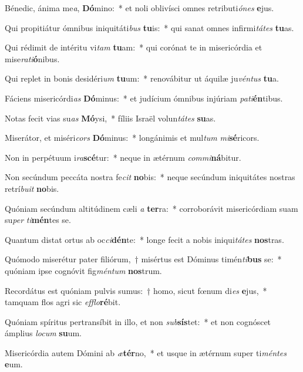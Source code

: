 \item Bénedic, ánima me\textit{a}, \textbf{Dó}mino:~* et noli oblivísci omnes retributi\textit{ó}\textit{nes} \textbf{e}jus.
\item Qui propitiátur ómnibus iniquitáti\textit{bus} \textbf{tu}is:~* qui sanat omnes infirmi\textit{tá}\textit{tes} \textbf{tu}as.
\item Qui rédimit de intéritu vi\textit{tam} \textbf{tu}am:~* qui corónat te in misericórdia et mise\textit{ra}\textit{ti}\textbf{ó}nibus.
\item Qui replet in bonis desidéri\textit{um} \textbf{tu}um:~* renovábitur ut áquilæ ju\textit{vén}\textit{tus} \textbf{tu}a.
\item Fáciens misericórdi\textit{as} \textbf{Dó}minus:~* et judícium ómnibus injúriam \textit{pa}\textit{ti}\textbf{én}tibus.
\item Notas fecit vias su\textit{as} \textbf{Mó}ysi,~* fíliis Israël volun\textit{tá}\textit{tes} \textbf{su}as.
\item Miserátor, et miséri\textit{cors} \textbf{Dó}minus:~* longánimis et mul\textit{tum} \textit{mi}\textbf{sé}ricors.
\item Non in perpétuum i\textit{ra}\textbf{scé}tur:~* neque in ætérnum \textit{com}\textit{mi}\textbf{ná}bitur.
\item Non secúndum peccáta nostra fe\textit{cit} \textbf{no}bis:~* neque secúndum iniquitátes nostras retrí\textit{bu}\textit{it} \textbf{no}bis.
\item Quóniam secúndum altitúdinem cæli \textit{a} \textbf{ter}ra:~* corroborávit misericórdiam suam su\textit{per} \textit{ti}\textbf{mén}tes se.
\item Quantum distat ortus ab oc\textit{ci}\textbf{dén}te:~* longe fecit a nobis iniqui\textit{tá}\textit{tes} \textbf{nos}tras.
\item Quómodo miserétur pater filiórum,~† misértus est Dóminus timén\textit{ti}\textbf{bus} se:~* quóniam ipse cognóvit fig\textit{mén}\textit{tum} \textbf{nos}trum.
\item Recordátus est quóniam pulvis sumus:~† homo, sicut fœnum di\textit{es} \textbf{e}jus,~* tamquam flos agri sic \textit{ef}\textit{flo}\textbf{ré}bit.
\item Quóniam spíritus pertransíbit in illo, et non \textit{sub}\textbf{sís}tet:~* et non cognóscet ámplius \textit{lo}\textit{cum} \textbf{su}um.
\item Misericórdia autem Dómini ab \textit{æ}\textbf{tér}no,~* et usque in ætérnum super ti\textit{mén}\textit{tes} \textbf{e}um.
